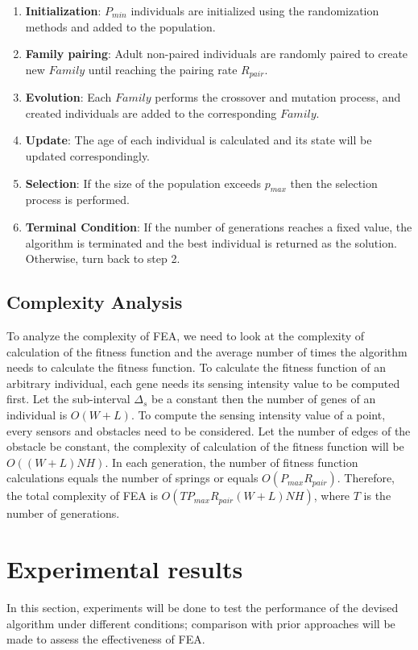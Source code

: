 \documentclass[final]{elsarticle}
\begin{document}
\begin{enumerate}
	\item \textbf{Initialization}: $P_{min}$ individuals are initialized using the randomization methods and added to the population.
	\item \textbf{Family pairing}: Adult non-paired individuals are randomly paired to create new $ Family $ until reaching the pairing rate $R_{pair}$.
	\item \textbf{Evolution}: Each $ Family $ performs the crossover and mutation process, and created individuals are added to the corresponding $ Family $.
	\item \textbf{Update}: The age of each individual is calculated and its state will be updated correspondingly.
	\item \textbf{Selection}: If the size of the population exceeds $p_{max}$ then the selection process is performed.
	\item \textbf{Terminal Condition}: If the number of generations reaches a fixed value, the algorithm is terminated and the best individual is returned as the solution. Otherwise, turn back to step 2.
\end{enumerate}

\subsection{Complexity Analysis}

To analyze the complexity of FEA, we need to look at the complexity of calculation of the fitness function and the average number of times the algorithm needs to calculate the fitness function. To calculate the fitness function of an arbitrary individual, each gene needs its sensing intensity value to be computed first. Let the sub-interval $ \Delta_s $ be a constant then the number of genes of an individual is $ O(W+L) $. To compute the sensing intensity value of a point, every sensors and obstacles need to be considered. Let the number of edges of the obstacle be constant, the complexity of calculation of the fitness function will be $ O((W+L)NH) $. In each generation, the number of fitness function calculations equals the number of springs or equals $O(P_{max}R_{pair})$. Therefore, the total complexity of FEA is $O(TP_{max}R_{pair}(W+L)NH)$, where $ T $ is the number of generations.

\section{Experimental results}
In this section, experiments will be done to test the performance of the devised algorithm under different conditions; comparison with prior approaches will be made to assess the effectiveness of FEA. 
\end{document}

